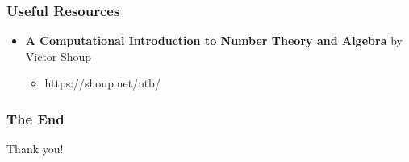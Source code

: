 \documentclass{beamer}
\begin{document}
\begin{frame}
  \frametitle{Useful Resources}
  \begin{itemize}
  \item \textbf{A Computational Introduction to Number Theory and Algebra} by
    Victor Shoup
    \begin{itemize}
    \item https://shoup.net/ntb/
    \end{itemize}
  \end{itemize}
\end{frame}

\begin{frame}
  \frametitle{The End}
  \begin{center}
    Thank you!
  \end{center}
\end{frame}
\end{document}
